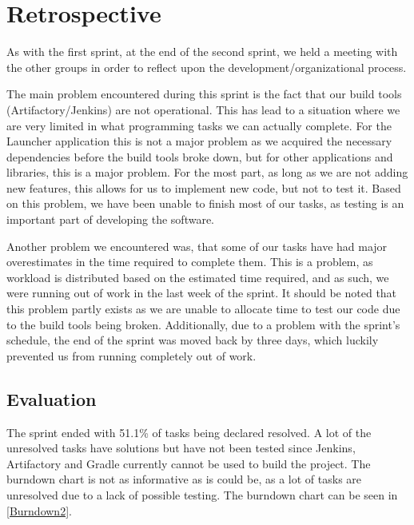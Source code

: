 \section{Retrospective}\label{S2Retro}
As with the first sprint, at the end of the second sprint, we held a meeting with
the other groups in order to reflect upon the development/organizational
process.\nl

The main problem encountered during this sprint is the fact that our build
tools (Artifactory/Jenkins) are not operational. This has lead to a
situation where we are very limited in what programming tasks we can actually
complete. For the Launcher application this is not a major problem as we
acquired the necessary dependencies before the build tools broke down, but for
other applications and libraries, this is a major problem. For the most part, as
long as we are not adding new features, this allows for us to implement new
code, but not to test it. Based on this problem, we have been unable to finish
most of our tasks, as testing is an important part of developing the
software.\nl

Another problem we encountered was, that some of our tasks have had major
overestimates in the time required to complete them. This is a problem, as
workload is distributed based on the estimated time required, and as such, we
were running out of work in the last week of the sprint. It should be noted that
this problem partly exists as we are unable to allocate time to test our code
due to the build tools being broken. Additionally, due to a problem with the
sprint's schedule, the end of the sprint was moved back by three days, which
luckily prevented us from running completely out of work.

\subsection{Evaluation}
The sprint ended with 51.1\% of tasks being declared resolved. A lot of the
unresolved tasks have solutions but have not been tested since Jenkins,
Artifactory and Gradle currently cannot be used to build the project.
The burndown chart is not as informative as is could
be, as a lot of tasks are unresolved due to a lack of
possible testing. The burndown chart can be seen in \autoref{Burndown2}.






